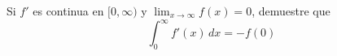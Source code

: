 \item Si $f'$ es continua en $[0, \infty)$ y $\lim_{x \to \infty} f(x) = 0$, demuestre que
    \[ \int_{0}^{\infty} f'(x) \, dx = -f(0) \]
